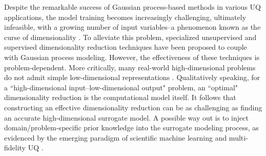 \documentclass[number,preprint,3p]{elsarticle}
\newcommand{\1}[2]{\mathbb{I}_{#1}\left(#2\right)}
\begin{document}
 Despite the remarkable success of Gaussian process-based methods in various UQ applications, the model training becomes increasingly challenging, ultimately infeasible, with a growing number of input variables--a phenomenon known as the curse of dimensionality \cite{lataniotis2020extending}. To alleviate this problem, specialized unsupervised \cite{giovanis2018uncertainty,giovanis2020data,dos2022grassmannian,kontolati2022survey} and supervised \cite{jiang2017high,zhou2021active,navaneeth2022surrogate,kim2023adaptive} dimensionality reduction techniques have been proposed to couple with Gaussian process modeling. However, the effectiveness of these techniques is problem-dependent. More critically, many real-world high-dimensional problems do not admit simple low-dimensional representations \cite{jiang2021recursive}. Qualitatively speaking, for a ``high-dimensional input--low-dimensional output" problem, an ``optimal" dimensionality reduction is the computational model itself. It follows that constructing an effective dimensionality reduction can be as challenging as finding an accurate high-dimensional surrogate model. A possible way out is to inject  domain/problem-specific prior knowledge into the surrogate modeling process, as evidenced by the emerging paradigm of scientific machine learning \cite{raissi2019physics,zhu2019physics,linka2022bayesian,meng2023pinn} and multi-fidelity UQ \cite{peherstorfer2018survey,peherstorfer2016multifidelity,kramer2019multifidelity}.
	
\end{document}
